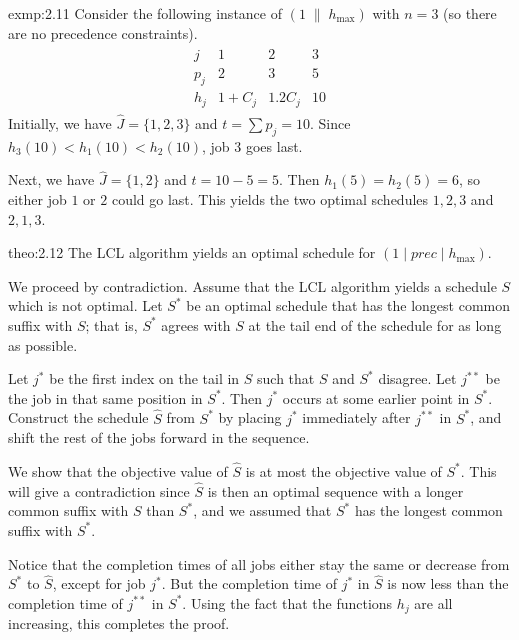 \begin{exmp}{exmp:2.11}
    Consider the following instance of $(1\;\|\;h_{\max})$ with $n = 3$ 
    (so there are no precedence constraints). 
    \begin{align*}
        \begin{array}{c|ccc}
            j   & 1       & 2      & 3 \\ \hline
            p_j & 2       & 3      & 5 \\
            h_j & 1 + C_j & 1.2C_j & 10
        \end{array}
    \end{align*}
    Initially, we have $\hat J = \{1, 2, 3\}$ and $t = \sum p_j = 10$. 
    Since $h_3(10) < h_1(10) < h_2(10)$, job $3$ goes last. 

    Next, we have $\hat J = \{1, 2\}$ and $t = 10 - 5 = 5$. Then 
    $h_1(5) = h_2(5) = 6$, so either job $1$ or $2$ could go last. This 
    yields the two optimal schedules $1, 2, 3$ and $2, 1, 3$. 
\end{exmp}

\begin{theo}{theo:2.12}
    The LCL algorithm yields an optimal schedule for $(1 \mid prec \mid h_{\max})$. 
\end{theo}
\begin{pf}
    We proceed by contradiction. Assume that the LCL algorithm yields a 
    schedule $S$ which is not optimal. Let $S^*$ be an optimal schedule 
    that has the longest common suffix with $S$; that is, $S^*$ agrees 
    with $S$ at the tail end of the schedule for as long as possible. 

    Let $j^*$ be the first index on the tail in $S$ such that $S$ and $S^*$ 
    disagree. Let $j^{**}$ be the job in that same position in $S^*$. 
    Then $j^*$ occurs at some earlier point in $S^*$. Construct 
    the schedule $\hat S$ from $S^*$ by placing $j^*$ immediately after 
    $j^{**}$ in $S^*$, and shift the rest of the jobs forward 
    in the sequence. 

    We show that the objective value of $\hat S$ is at most the objective 
    value of $S^*$. This will give a contradiction since $\hat S$ is then 
    an optimal sequence with a longer common suffix with $S$ than $S^*$, 
    and we assumed that $S^*$ has the longest common suffix with $S^*$. 

    Notice that the completion times of all jobs either stay the same 
    or decrease from $S^*$ to $\hat S$, except for job $j^*$. But 
    the completion time of $j^*$ in $\hat S$ is now less than the 
    completion time of $j^{**}$ in $S^*$. Using the fact that the functions 
    $h_j$ are all increasing, this completes the proof. 
\end{pf}
